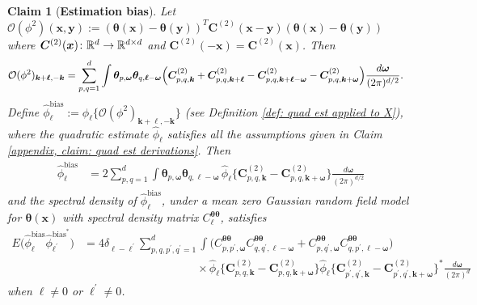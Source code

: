 \documentclass[10pt,noinfoline]{imsart}
\newtheorem{claim}{Claim}
\newcommand{\bs}{\boldsymbol}
\begin{document}
%
%

\begin{claim}[{\bf Estimation bias}]\label{thm: bias in the appendix}
    Let $\mathcal O(\phi^2)(\bs x,\bs y) := {(\bs\theta(\bs x)-\bs\theta(\bs y))}^T \bs C^{(2)}(\bs x-\bs y) (\bs\theta(\bs x)-\bs\theta(\bs y))$ where $\bs C^{(2)}(\bs x)\colon\Bbb R^d \rightarrow \Bbb R^{d\times d}$ and $\bs C^{(2)}(-\bs x)=\bs C^{(2)}(\bs x)$. Then
    \begin{align}
    	\label{eq: the form of Op2}
        \mathcal O(\phi^2)_{\bs k+\bs\ell, -\bs k}
        &=\sum_{p,q = 1}^d
        \int \bs\theta_{p,\bs\omega}\bs\theta_{q,\bs\ell - \bs\omega}
		 \Bigl(
         {\bs C^{(2)}_{p,q,\bs k}}
        + {\bs C^{(2)}_{p,q,\bs k +\bs \ell}}
        - {\bs C^{(2)}_{p,q,\bs k +\bs \ell - \bs\omega}}
        - {\bs C^{(2)}_{p,q,\bs k + \bs\omega}}
        \Bigr)\frac{d\bs\omega}{(2\pi)^{d/2}}.
    \end{align}
    Define $\hat\phi_{\bs \ell}^{\text{bias}}:=\hat\phi_{\bs \ell}\big\{\mathcal O(\phi^2)_{\bs k+\bs \ell, -\bs k}\big\}$ (see Definition \ref{def: quad est applied to X}), where the quadratic estimate $\hat\phi_{\bs \ell}$ satisfies all the assumptions given in Claim \ref{appendix, claim: quad est derivations}. Then 
    \begin{align}
    	\label{eq: the form of hatphibias}
        \hat\phi_{\bs \ell}^{\text{bias}}&= 2\sum_{p,q=1}^d
    	\int 
    	\bs\theta_{p,\bs\omega}\bs\theta_{q,\bs \ell - \bs\omega}\, \hat\phi_{\bs \ell}\Big\{{\bs C^{(2)}_{p,q,\bs k}}- {\bs C^{(2)}_{p,q,\bs k + \bs\omega}}\Big\}\frac{d\bs\omega}{(2\pi)^{d/2}}
   	\end{align}
    and the spectral density of $\hat\phi_{\bs \ell}^{\text{bias}}$, under a mean zero Gaussian random field model for $\bs\theta(\bs x)$ with spectral density matrix $C_{\bs \ell}^{\bs \theta\bs\theta}$, satisfies
	\begin{align}
    	\label{eq: the form of the spectrum for hatphibias}
		E\big(\hat\phi_{\bs \ell}^{\text{bias}} \hat\phi_{\bs \ell^\prime}^{\text{bias}^*}\big)
        &=
        4\delta_{\bs\ell-\bs \ell^\prime}\!\!\! \sum_{p,q,p^\prime,q^\prime=1}^d \int 
        \Big(
        C^{\bs \theta\bs \theta}_{p,p^\prime,\bs \omega}C^{\bs \theta\bs \theta}_{q,q^\prime,\bs \ell - \bs \omega}
        + C^{\bs \theta\bs \theta}_{p,q^\prime,\bs \omega}C^{\bs \theta\bs \theta}_{q,p^\prime,\bs \ell - \bs \omega}
        \Big)\nonumber
    	\\
        &\qquad\qquad\qquad\qquad\qquad\times
        \hat\phi_{\bs \ell}\Big\{{\bs C^{(2)}_{p,q,\bs k}}- {\bs C^{(2)}_{p,q,\bs k + \bs\omega}}\Big\}
        \hat\phi_{\bs \ell}\Big\{{\bs C^{(2)}_{p^\prime,q^\prime,\bs k}}- {\bs C^{(2)}_{p^\prime,q^\prime,\bs k + \bs\omega}}\Big\}^*\frac{d\bs\omega}{(2\pi)^{d}}
        \end{align}
        when $\bs \ell \neq 0$ or $\bs \ell^\prime \neq 0$.
\end{claim}
\end{document}
